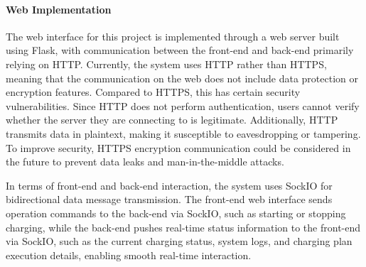 \documentclass[
english,
ruledheaders=section,%
class=report,%
thesis={type=Report},%
accentcolor=9c,%
custommargins=true,%
marginpar=false,%
parskip=half-,%
fontsize=11pt,%
logofile={img/tuda_logo.pdf}, %
]{tudapub}
\begin{document}

    \paragraph{Web Implementation}
    The web interface for this project is implemented through a web server built using Flask, with communication between the front-end and back-end primarily relying on HTTP. Currently, the system uses HTTP rather than HTTPS, meaning that the communication on the web does not include data protection or encryption features. Compared to HTTPS, this has certain security vulnerabilities. Since HTTP does not perform authentication, users cannot verify whether the server they are connecting to is legitimate. Additionally, HTTP transmits data in plaintext, making it susceptible to eavesdropping or tampering. To improve security, HTTPS encryption communication could be considered in the future to prevent data leaks and man-in-the-middle attacks.

    In terms of front-end and back-end interaction, the system uses SockIO for bidirectional data message transmission. The front-end web interface sends operation commands to the back-end via SockIO, such as starting or stopping charging, while the back-end pushes real-time status information to the front-end via SockIO, such as the current charging status, system logs, and charging plan execution details, enabling smooth real-time interaction.


\end{document}

